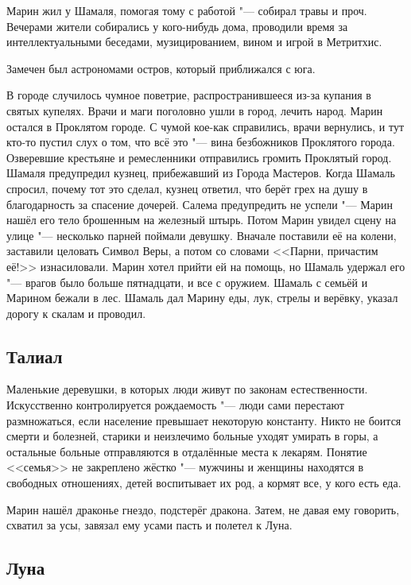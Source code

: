 Марин жил у Шамаля, помогая тому с работой "--- собирал травы и проч.
Вечерами жители собирались у кого-нибудь дома, проводили время за интеллектуальными беседами, музицированием, вином и игрой в Метритхис.

Замечен был астрономами остров, который приближался с юга.

В городе случилось чумное поветрие, распространившееся из-за купания в святых купелях.
Врачи и маги поголовно ушли в город, лечить народ.
Марин остался в Проклятом городе.
С чумой кое-как справились, врачи вернулись, и тут кто-то пустил слух о том, что всё это "--- вина безбожников Проклятого города.
Озверевшие крестьяне и ремесленники отправились громить Проклятый город.
Шамаля предупредил кузнец, прибежавший из Города Мастеров.
Когда Шамаль спросил, почему тот это сделал, кузнец ответил, что берёт грех на душу в благодарность за спасение дочерей.
Салема предупредить не успели "--- Марин нашёл его тело брошенным на железный штырь.
Потом Марин увидел сцену на улице "--- несколько парней поймали девушку.
Вначале поставили её на колени, заставили целовать Символ Веры, а потом со словами <<Парни, причастим её!>> изнасиловали.
Марин хотел прийти ей на помощь, но Шамаль удержал его "--- врагов было больше пятнадцати, и все с оружием.
Шамаль с семьёй и Марином бежали в лес.
Шамаль дал Марину еды, лук, стрелы и верёвку, указал дорогу к скалам и проводил.

\subsection{Талиал}

Маленькие деревушки, в которых люди живут по законам естественности.
Искусственно контролируется рождаемость "--- люди сами перестают размножаться, если население превышает некоторую константу.
Никто не боится смерти и болезней, старики и неизлечимо больные уходят умирать в горы, а остальные больные отправляются в отдалённые места к лекарям.
Понятие <<семья>> не закреплено жёстко "--- мужчины и женщины находятся в свободных отношениях, детей воспитывает их род, а кормят все, у кого есть еда. 

Марин нашёл драконье гнездо, подстерёг дракона.
Затем, не давая ему говорить, схватил за усы, завязал ему усами пасть и полетел к Луна.

\subsection{Луна}

